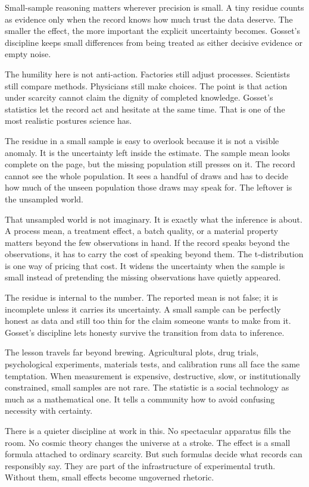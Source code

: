 Small-sample reasoning matters wherever precision is small. A tiny residue
counts as evidence only when the record knows how much trust the data
deserve. The smaller the effect, the more important the explicit uncertainty
becomes. Gosset's discipline keeps small differences from being treated as either
decisive evidence or empty noise.

The humility here is not anti-action. Factories still adjust processes.
Scientists still compare methods. Physicians still make choices. The point is
that action under scarcity cannot claim the dignity of completed knowledge.
Gosset's statistics let the record act and hesitate at the same time. That is
one of the most realistic postures science has.

The residue in a small sample is easy to overlook because it is not a visible
anomaly. It is the uncertainty left inside the estimate. The sample mean looks
complete on the page, but the missing population still presses on it. The
record cannot see the whole population. It sees a handful of draws and has
to decide how much of the unseen population those draws may speak for. The
leftover is the unsampled world.

That unsampled world is not imaginary. It is exactly what the inference is
about. A process mean, a treatment effect, a batch quality, or a material
property matters beyond the few observations in hand. If the record speaks
beyond the observations, it has to carry the cost of speaking beyond them. The
t-distribution is one way of pricing that cost. It widens the uncertainty
when the sample is small instead of pretending the missing observations have
quietly appeared.

The residue is internal to the number. The reported mean is not false; it is
incomplete unless it carries its uncertainty. A small sample can be perfectly
honest as data and still too thin for the claim someone wants to make from it.
Gosset's discipline lets honesty survive the transition from data to inference.

The lesson travels far beyond brewing. Agricultural plots, drug trials,
psychological experiments, materials tests, and calibration runs all face the
same temptation. When measurement is expensive, destructive, slow, or
institutionally constrained, small samples are not rare. The statistic is a
social technology as much as a mathematical one. It tells a community how to
avoid confusing necessity with certainty.

There is a quieter discipline at work in this. No spectacular apparatus fills the
room. No cosmic theory changes the universe at a stroke. The effect is a
small formula attached to ordinary scarcity. But such formulas decide what
records can responsibly say. They are part of the infrastructure of
experimental truth. Without them, small effects become ungoverned rhetoric.

